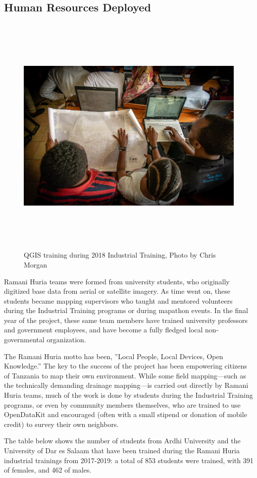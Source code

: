 \documentclass[a4paper,12pt,twoside]{article}
\begin{document}
\subsection{Human Resources Deployed}
\begin{figure}[h!]
	\centering
	\includegraphics[width=\textwidth, height=12cm]{images/Map_production.JPG}
	\caption{QGIS training during 2018 Industrial Training, Photo by Chris Morgan}
\end{figure}
\begin{multicols}{2}
Ramani Huria teams were formed from university students, who originally digitized base data from aerial or satellite imagery.  As time went on, these students became mapping  supervisors who taught and mentored volunteers during the Industrial Training programs or during mapathon events. In the final year of the project, these same team members have trained university professors and government employees, and have become a fully fledged local non-governmental organization. 

The Ramani Huria motto has been, ”Local People, Local Devices, Open Knowledge.” The key to the success of the project has been empowering citizens of Tanzania to map their own environment. While some field mapping—such as the technically demanding drainage mapping—is carried out directly by Ramani Huria teams, much of the work is done by students during the Industrial Training programs, or even by community members themselves, who are trained to use OpenDataKit and encouraged (often with a small stipend or donation of mobile credit) to survey their own neighbors.

The table below shows the number of students from Ardhi University and the University of Dar es Salaam that have been trained during the Ramani Huria industrial trainings from 2017-2019: a total of 853 students were trained, with 391 of females, and 462 of males.
\end{multicols}
\end{document}

